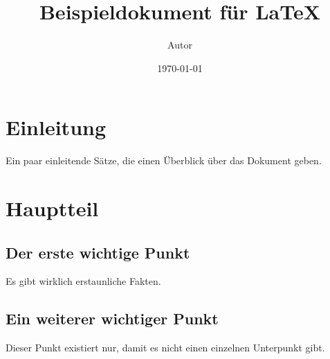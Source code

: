 \documentclass{scrartcl}
\title{Beispieldokument für \LaTeX}
\author{Autor}
\date{\today}
\begin{document}
\maketitle
\tableofcontents
\newpage

\section{Einleitung}
Ein paar einleitende Sätze, die einen Überblick über das Dokument geben.

\section{Hauptteil}
\subsection{Der erste wichtige Punkt}
Es gibt wirklich erstaunliche Fakten.

\subsection{Ein weiterer wichtiger Punkt}
Dieser Punkt existiert nur, damit es nicht einen einzelnen Unterpunkt gibt.
\end{document}
